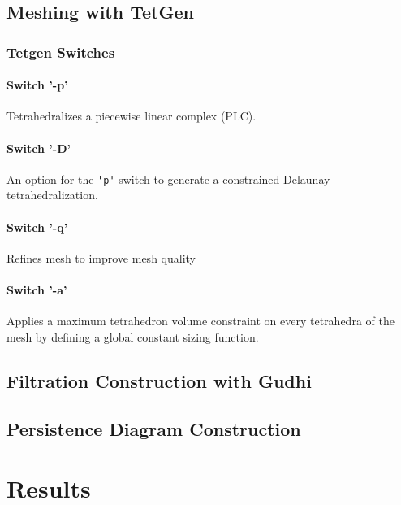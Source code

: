 \documentclass[ma]{uncgdissertationexp}
\theoremstyle{plain}
\theoremstyle{definition}
\theoremstyle{remark}
\begin{document}
\section{Meshing with TetGen}
\subsection{Tetgen Switches}
\cite{tetgen}
\subsubsection{Switch '-p'}
Tetrahedralizes a piecewise linear complex (PLC).

\subsubsection{Switch '-D'}
An option for the \verb"'p'" switch to generate a constrained Delaunay tetrahedralization.

\subsubsection{Switch '-q'}
Refines mesh to improve mesh quality

\subsubsection{Switch '-a'}
Applies a maximum tetrahedron volume constraint on every tetrahedra of the mesh by defining a global constant sizing function.

\section{Filtration Construction with Gudhi}

\section{Persistence Diagram Construction}

\chapter{Results}
\newpage
\end{document}
